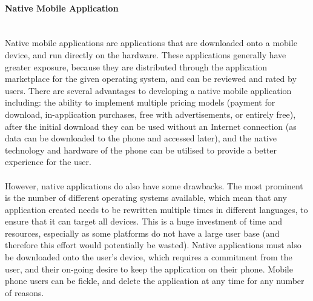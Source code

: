 \paragraph{Native Mobile Application}\ \\
Native mobile applications are applications that are downloaded onto a mobile device, and run directly on the hardware. These applications generally have greater exposure, because they are distributed through the application marketplace for the given operating system, and can be reviewed and rated by users. There are several advantages to developing a native mobile application including: the ability to implement multiple pricing models (payment for download, in-application purchases, free with advertisements, or entirely free), after the initial download they can be used without an Internet connection (as data can be downloaded to the phone and accessed later), and the native technology and hardware of the phone can be utilised to provide a better experience for the user.\ \\
\ \\
However, native applications do also have some drawbacks. The most prominent is the number of different operating systems available, which mean that any application created needs to be rewritten multiple times in different languages, to ensure that it can target all devices. This is a huge investment of time and resources, especially as some platforms do not have a large user base (and therefore this effort would potentially be wasted). Native applications must also be downloaded onto the user's device, which requires a commitment from the user, and their on-going desire to keep the application on their phone. Mobile phone users can be fickle, and delete the application at any time for any number of reasons. 

